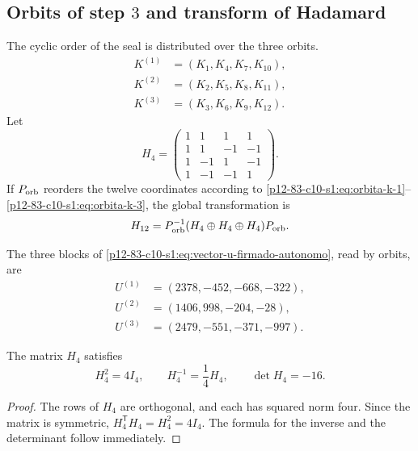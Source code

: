 \subsection{Orbits of step \(3\) and transform of Hadamard}

The cyclic order of the seal is distributed over the three orbits.
\begin{align}
 K^{(1)}&=(K_1,K_4,K_7,K_{10}),
 \label{p12-83-c10-s1:eq:orbita-k-1}\\
 K^{(2)}&=(K_2,K_5,K_8,K_{11}),
 \label{p12-83-c10-s1:eq:orbita-k-2}\\
 K^{(3)}&=(K_3,K_6,K_9,K_{12}).
 \label{p12-83-c10-s1:eq:orbita-k-3}
\end{align}
Let
\begin{equation}
 H_4=
 \begin{pmatrix}
 1&1&1&1\\
 1&1&-1&-1\\
 1&-1&1&-1\\
 1&-1&-1&1
 \end{pmatrix}.
 \label{p12-83-c10-s1:eq:matriz-hadamard-cuatro-autonoma}
\end{equation}
If \(P_{\rm orb}\) reorders the twelve coordinates according to
\eqref{p12-83-c10-s1:eq:orbita-k-1}--\eqref{p12-83-c10-s1:eq:orbita-k-3}, the global transformation is
\begin{equation}
 \mathcal H_{12}
 =P_{\rm orb}^{-1}
 (H_4\oplus H_4\oplus H_4)P_{\rm orb}.
 \label{p12-83-c10-s1:eq:hadamard-global-doce}
\end{equation}

The three blocks of \eqref{p12-83-c10-s1:eq:vector-u-firmado-autonomo}, read by
orbits, are
\begin{align*}
 U^{(1)}&=(2378,-452,-668,-322),\\
 U^{(2)}&=(1406,998,-204,-28),\\
 U^{(3)}&=(2479,-551,-371,-997).
\end{align*}

\begin{lemma}
\label{p12-83-c10-s1:lem:cuarto-inversa-hadamard}
The matrix \(H_4\) satisfies
\begin{equation}
 H_4^2=4I_4,
 \qquad
 H_4^{-1}=\frac14H_4,
 \qquad
 \det H_4=-16.
 \label{p12-83-c10-s1:eq:identidades-hadamard-cuatro}
\end{equation}
\end{lemma}

\begin{proof}
The rows of \(H_4\) are orthogonal, and each has squared norm four.
Since the matrix is symmetric, \(H_4^{\mathsf T}H_4=H_4^2=4I_4\). The
formula for the inverse and the determinant follow immediately.
\end{proof}

